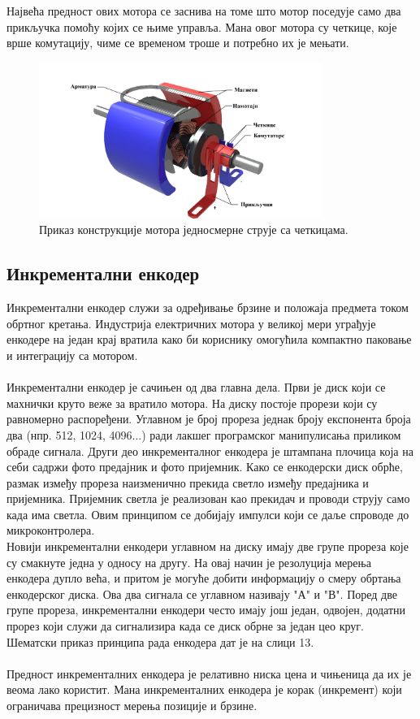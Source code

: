 \documentclass{article}
\begin{document}
Највећа предност ових мотора се заснива на томе што мотор поседује само два прикључка помоћу којих се њиме управља. Мана овог мотора су четкице, које врше комутацију, чиме се временом троше и потребно их је мењати. \cite{jerkan}
\begin{figure}[H]
\centering
\includegraphics[height=2in]{Images/MotorJednosmerneStruje.jpg }
\caption{Приказ конструкције мотора једносмерне струје са четкицама.\cite{dc_motor_slika}}
\label{fig:figure12}
\end{figure}

\subsection{Инкрементални енкодер}
Инкрементални енкодер служи за одређивање брзине и положаја предмета током обртног кретања. Индустрија електричних мотора у великој мери уграђује енкодере на један крај вратила како би кориснику омогућила компактно паковање и интеграцију са мотором.\ \\
\\
Инкрементални енкодер је сачињен од два главна дела. Први је диск који се махнички круто веже за вратило мотора. На диску постоје прорези који су равномерно распоређени. Углавном је број прореза једнак броју експонента броја два (нпр. 512, 1024, 4096...) ради лакшег програмског манипулисања приликом обраде сигнала. Други део инкременталног енкодера је штампана плочица која на себи садржи фото предајник и фото пријемник. Како се енкодерски диск обрће, размак између прореза наизменично прекида светло између предајника и пријемника. Пријемник светла је реализован као прекидач и проводи струју само када има светла. Овим принципом се добијају импулси који се даље спроводе до микроконтролера.\\
Новији инкрементални енкодери углавном на диску имају две групе прореза које су смакнуте једна у односу на другу. На овај начин је резолуција мерења енкодера дупло већа, и притом је могуће добити информацију о смеру обртања енкодерског диска. Ова два сигнала се углавном називају "А" и "В". Поред две групе прореза, инкрементални енкодери често имају још један, одвојен, додатни прорез који служи да сигнализира када се диск обрне за један цео круг. Шематски приказ принципа рада енкодера дат је на слици 13.\ \\
\\
Предност инкременталних енкодера је релативно ниска цена и чињеница да их је веома лако користит. Мана инкременталних енкодера је корак (инкремент) који ограничава прецизност мерења позиције и брзине.
\cite{encoder}
\end{document}
